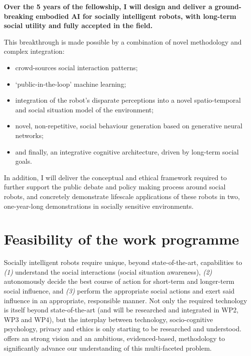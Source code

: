 \begin{framed}

\bf Over the 5 years of the fellowship, I will design and deliver a ground-breaking embodied AI for
socially intelligent robots, with long-term social utility and fully accepted in
the field.
    
This breakthrough is made possible by a combination of novel methodology and
complex integration:
\begin{itemize}
        \item crowd-sources social interaction patterns;
        \item `public-in-the-loop' machine learning;
        \item integration of the robot's disparate perceptions into a novel
            spatio-temporal and social situation model of the environment;
        \item novel, non-repetitive, social behaviour generation based on
            generative neural networks;
        \item and finally, an integrative cognitive architecture, driven by
            long-term social goals.
\end{itemize}

In addition, I will deliver the conceptual and ethical framework required to
further support the public debate and policy making process around social
robots, and concretely demonstrate lifescale applications of these robots in
two, one-year-long demonstrations in socially sensitive environments.

\end{framed}

\section{Feasibility of the \project work programme}

Socially intelligent robots require unique, beyond state-of-the-art,
capabilities to \emph{(1)} understand the social interactions (social
situation awareness), \emph{(2)} autonomously decide the best course of action for
short-term and longer-term social influence, and \emph{(3)} perform the
appropriate social actions and exert said influence in an appropriate,
responsible manner.
Not only the required technology is itself beyond state-of-the-art (and will be
researched and integrated in WP2, WP3 and WP4), but the
interplay between technology, socio-cognitive psychology, privacy and ethics is
only starting to be researched and understood. \project offers an
strong vision and an ambitious, evidenced-based, methodology to significantly
advance our understanding of this multi-faceted problem.

